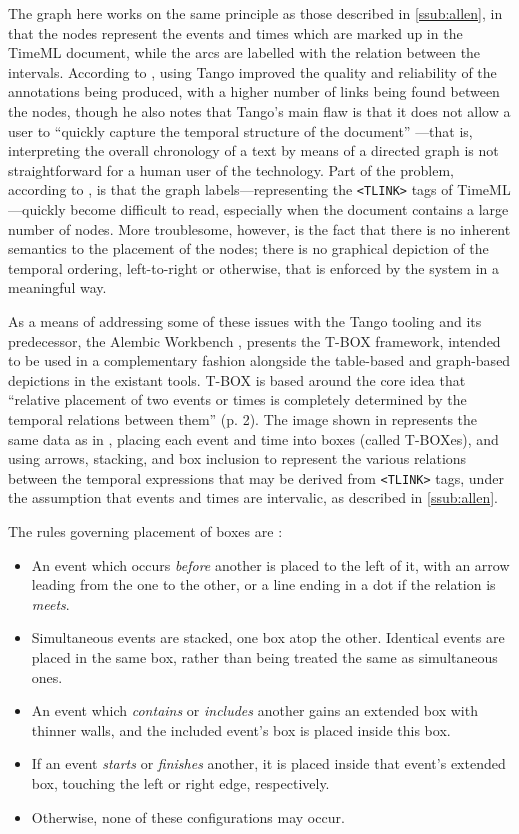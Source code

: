 \documentclass[a4paper,12pt,leqno,twoside]{article}
\begin{document}
The graph here works on the same principle as those described in \cref{ssub:allen}, in that the nodes represent the events and times which are marked up in the TimeML document, while the arcs are labelled with the relation between the intervals. According to \citet[p. 2]{verhagen2005TBOX}, using Tango improved the quality and reliability of the annotations being produced, with a higher number of links being found between the nodes, though he also notes that Tango's main flaw is that it does not allow a user to ``quickly capture the temporal structure of the document'' \citep[p. 2]{verhagen2005TBOX}---that is, interpreting the overall chronology of a text by means of a directed graph is not straightforward for a human user of the technology. Part of the problem, according to \citet{verhagen2005TBOX}, is that the graph labels---representing the \verb|<TLINK>| tags of TimeML---quickly become difficult to read, especially when the document contains a large number of nodes. More troublesome, however, is the fact that there is no inherent semantics to the placement of the nodes; there is no graphical depiction of the temporal ordering, left-to-right or otherwise, that is enforced by the system in a meaningful way.

As a means of addressing some of these issues with the Tango tooling and its predecessor, the Alembic Workbench \citep{day1997mixed}, \citet{verhagen2005TBOX} presents the T-BOX framework, intended to be used in a complementary fashion alongside the table-based and graph-based depictions in the existant tools. T-BOX is based around the core idea that ``relative placement of two events or times is completely determined by the temporal relations between them'' (p. 2). The image shown in  represents the same data as in , placing each event and time into boxes (called T-BOXes), and using arrows, stacking, and box inclusion to represent the various relations between the temporal expressions that may be derived from \verb|<TLINK>| tags, under the assumption that events and times are intervalic, as described in \cref{ssub:allen}.

The rules governing placement of boxes are \citep[pp. 3--5]{verhagen2005TBOX}:
\begin{itemize}
	\item An event which occurs \textit{before} another is placed to the left of it, with an arrow leading from the one to the other, or a line ending in a dot if the relation is \textit{meets}.
	\item Simultaneous events are stacked, one box atop the other. Identical events are placed in the same box, rather than being treated the same as simultaneous ones.
	\item An event which \textit{contains} or \textit{includes} another gains an extended box with thinner walls, and the included event's box is placed inside this box.
	\item If an event \textit{starts} or \textit{finishes} another, it is placed inside that event's extended box, touching the left or right edge, respectively.
	\item Otherwise, none of these configurations may occur.
\end{itemize}
\end{document}
